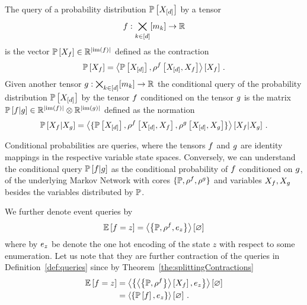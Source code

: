 \begin{definition}\label{def:queries}
	The query of a probability distribution $\mathbb{P}\left[X_{[d]}\right]$ by a tensor 
		\[ f : \bigtimes_{k\in[d]}[m_{k}] \rightarrow \mathbb{R} \]
	is the vector $\mathbb{P}\left[X_{f}\right] \in \mathbb{R}^{\left|\mathrm{im}\left(f\right)\right|}$ defined as the contraction
	\begin{align*}
		\mathbb{P}\left[X_{f}\right] = \left\langle \mathbb{P}\left[X_{[d]}\right],\rho^{f}\left[X_{[d]},X_{f}\right]\right\rangle \left[ X_{f} \right] \, . 
	\end{align*}
	Given another tensor $g: \bigtimes_{k\in[d]}[m_{k}] \rightarrow \mathbb{R} $ the conditional query of the probability distribution $\mathbb{P}\left[X_{[d]}\right]$ by the tensor $f$ conditioned on the tensor $g$ is the matrix $\mathbb{P}\left[f|g\right]\in\mathbb{R}^{\left|\mathrm{im}\left(f\right)\right|}\otimes \mathbb{R}^{\left|\mathrm{im}\left(g\right)\right|}$ defined as the normation
	\begin{align*}
		\mathbb{P}\left[X_{f}|X_{g}\right] 
		= \left\langle \{
		\mathbb{P}\left[X_{[d]}\right],\rho^{f}\left[X_{[d]},X_{f}\right],\rho^{g}\left[X_{[d]},X_{g}\right]
		\}\right\rangle \left[ 
		X_{f} | X_{g}
		 \right] \, . 
	\end{align*}
\end{definition}

Conditional probabilities are queries, where the tensors $f$ and $g$ are identity mappings in the respective variable state spaces.
Conversely, we can understand the conditional query $\mathbb{P}\left[f|g\right]$ as the conditional probability of $f$ conditioned on $g$, of the underlying Markov Network with cores $\{\mathbb{P}, \rho^{f}, \rho^{g} \}$ and variables $X_{f},X_{g}$ besides the variables distributed by $\mathbb{P}$.

We further denote event queries by
	\[  \mathbb{E}\left[f=z\right] = \left\langle \left\{\mathbb{P},\rho^{f},e_{z}\right\}\right\rangle \left[ \varnothing \right] \]
where by $e_{z}$ be denote the one hot encoding of the state $z$ with respect to some enumeration.
Let us note that they are further contraction of the queries in Definition~\ref{def:queries} since by Theorem~\ref{the:splittingContractions}
\begin{align*}
	 \mathbb{E}\left[f=z\right] 
	& =  \left\langle \left\{ \left\langle \left\{\mathbb{P},\rho^{f}\right\}\right\rangle \left[ X_{f} \right] ,e_{z}\right\}\right\rangle \left[ \varnothing \right] \\
	& =  \left\langle \left\{ \mathbb{P}\left[f\right] ,e_{z}\right\}\right\rangle \left[ \varnothing \right] \, . 
\end{align*}

